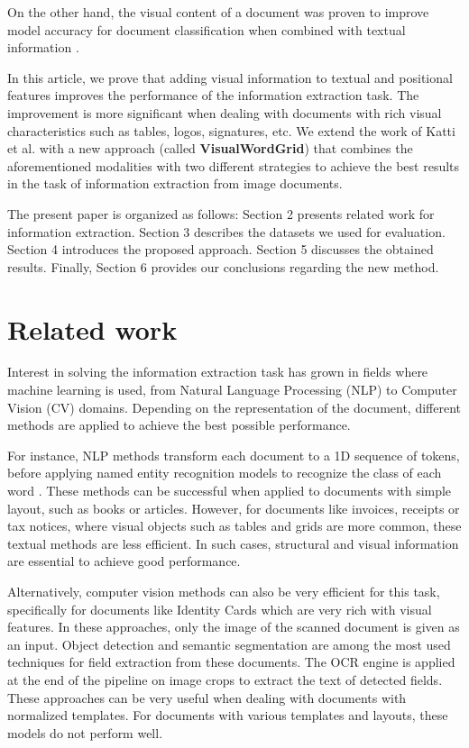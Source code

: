 \documentclass[runningheads]{llncs}
\begin{document}
On the other hand, the visual content of a document was proven to improve  model accuracy for document classification when combined with textual information \cite{kuider}.

In this article, we prove that adding visual information to textual and positional features improves the performance of the information extraction task.
The improvement is more significant when dealing with documents with rich visual characteristics such as tables, logos, signatures, etc. 
We extend the work of Katti et al. \cite{chargrid,bertgrid} with a new approach (called \textbf{VisualWordGrid}) that combines the aforementioned modalities with two different strategies to achieve the best results in the task of information extraction from image documents.

The present paper is organized as follows: Section 2 presents related work for information extraction. Section 3 describes the datasets we used for evaluation. Section 4 introduces the proposed approach. Section 5 discusses the obtained results. Finally, Section 6 provides our conclusions regarding the new method.

\section{Related work}
Interest in solving the information extraction task has grown in fields where machine learning is used, from Natural Language Processing (NLP) to Computer Vision (CV) domains. Depending on the representation of the document, different methods are applied to achieve the best possible performance. 

For instance, NLP methods transform each document to a 1D sequence of tokens, before applying named entity recognition models to recognize the class of each word \cite{ner}. These methods can be successful when applied to documents with simple layout, such as books or articles. However, for documents like invoices, receipts or tax notices, where visual objects such as tables and grids are more common, these textual methods are less efficient. 
In such cases, structural and visual information are essential to achieve good  performance.

Alternatively, computer vision methods can also be very efficient for this task, specifically for documents like Identity Cards which are very rich with visual features. In these approaches, only the image of the scanned document is given as an input. Object detection and semantic segmentation are among the most used techniques for field extraction \cite{cnn} from these documents. The OCR engine is applied at the end of the pipeline on image crops to extract the text of detected fields. These approaches can be very useful when dealing with documents with normalized templates. For documents with various templates and layouts, these models do not perform  well. 
\end{document}
